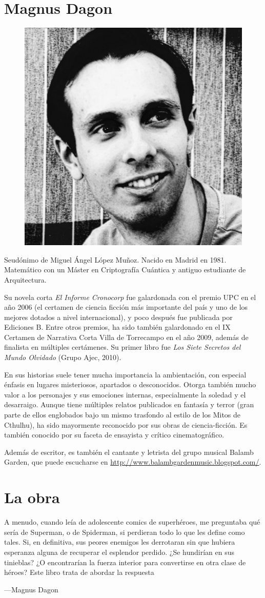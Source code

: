 \section*{Magnus Dagon}
\begin{figure}
	\includegraphics[width=.4\textwidth]{images/magnus_dagon}
\end{figure}

Seudónimo de Miguel Ángel López Muñoz. Nacido en Madrid en 1981. Matemático con un Máster en Criptografía Cuántica y antiguo estudiante de Arquitectura. 

Su novela corta \emph{El Informe Cronocorp} fue galardonada con el premio UPC en el año 2006 (el certamen de ciencia ficción más importante del país y uno de los mejores dotados a nivel internacional), y poco después fue publicada por Ediciones B. Entre otros premios, ha sido también galardonado en el IX Certamen de Narrativa Corta Villa de Torrecampo en el año 2009, además de finalista en múltiples certámenes. Su primer libro fue \emph{Los Siete Secretos del Mundo Olvidado} (Grupo Ajec, 2010).

En sus historias suele tener mucha importancia la ambientación, con especial énfasis en lugares misteriosos, apartados o desconocidos. Otorga también mucho valor a los personajes y sus emociones internas, especialmente la soledad y el desarraigo. Aunque tiene múltiples relatos publicados en fantasía y terror (gran parte de ellos englobados bajo un mismo trasfondo al estilo de los Mitos de Cthulhu), ha sido mayormente reconocido por sus obras de ciencia-ficción. Es también conocido por su faceta de ensayista y crítico cinematográfico.

Además de escritor, es también el cantante y letrista del grupo musical Balamb Garden, que puede escucharse en \url{http://www.balambgardenmusic.blogspot.com/}.

\section*{La obra}
\epigraph{
	\lquoti A menudo, cuando leía de adolescente comics de superhéroes, me preguntaba qué sería de Superman, o de Spiderman, si perdieran todo lo que les define como tales. Si, en definitiva, sus peores enemigos les derrotaran sin que hubiera esperanza alguna de recuperar el esplendor perdido. ¿Se hundirían en sus tinieblas? ¿O encontrarían la fuerza interior para convertirse en otra clase de héroes? Este libro trata de abordar la respuesta\rquoti
}{---Magnus Dagon}

